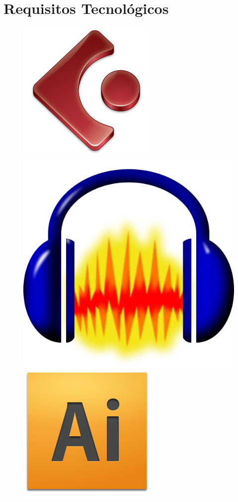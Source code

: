 \documentclass[11pt]{article} %
\begin{document}
\section{Requisitos Tecnológicos}

\begin{figure}[tb]
\begin{center}
  \includegraphics[scale=0.3]{res/cubase-Logo.png} \quad
  \includegraphics[scale=0.04]{res/audacity.png} \quad
  \includegraphics[scale=0.3]{res/adobe_illustrator.png} \quad

\end{center}
\end{figure}
\end{document}
